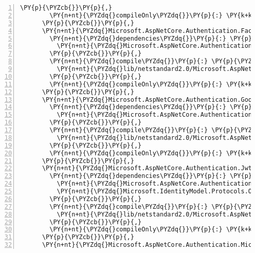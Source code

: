\begin{Verbatim}[commandchars=\\\{\},numbers=left,firstnumber=1,stepnumber=1,numberblanklines=0]
        \PY{p}{\PYZcb{}}\PY{p}{,}
        \PY{n+nt}{\PYZdq{}compileOnly\PYZdq{}}\PY{p}{:} \PY{k+kc}{true}
      \PY{p}{\PYZcb{}}\PY{p}{,}
      \PY{n+nt}{\PYZdq{}Microsoft.AspNetCore.Authentication.Facebook/2.1.0\PYZhy{}rc1\PYZhy{}final\PYZdq{}}\PY{p}{:} \PY{p}{\PYZob{}}
        \PY{n+nt}{\PYZdq{}dependencies\PYZdq{}}\PY{p}{:} \PY{p}{\PYZob{}}
          \PY{n+nt}{\PYZdq{}Microsoft.AspNetCore.Authentication.OAuth\PYZdq{}}\PY{p}{:} \PY{l+s+s2}{\PYZdq{}2.1.0\PYZhy{}rc1\PYZhy{}final\PYZdq{}}
        \PY{p}{\PYZcb{}}\PY{p}{,}
        \PY{n+nt}{\PYZdq{}compile\PYZdq{}}\PY{p}{:} \PY{p}{\PYZob{}}
          \PY{n+nt}{\PYZdq{}lib/netstandard2.0/Microsoft.AspNetCore.Authentication.Facebook.dll\PYZdq{}}\PY{p}{:} \PY{p}{\PYZob{}}\PY{p}{\PYZcb{}}
        \PY{p}{\PYZcb{}}\PY{p}{,}
        \PY{n+nt}{\PYZdq{}compileOnly\PYZdq{}}\PY{p}{:} \PY{k+kc}{true}
      \PY{p}{\PYZcb{}}\PY{p}{,}
      \PY{n+nt}{\PYZdq{}Microsoft.AspNetCore.Authentication.Google/2.1.0\PYZhy{}rc1\PYZhy{}final\PYZdq{}}\PY{p}{:} \PY{p}{\PYZob{}}
        \PY{n+nt}{\PYZdq{}dependencies\PYZdq{}}\PY{p}{:} \PY{p}{\PYZob{}}
          \PY{n+nt}{\PYZdq{}Microsoft.AspNetCore.Authentication.OAuth\PYZdq{}}\PY{p}{:} \PY{l+s+s2}{\PYZdq{}2.1.0\PYZhy{}rc1\PYZhy{}final\PYZdq{}}
        \PY{p}{\PYZcb{}}\PY{p}{,}
        \PY{n+nt}{\PYZdq{}compile\PYZdq{}}\PY{p}{:} \PY{p}{\PYZob{}}
          \PY{n+nt}{\PYZdq{}lib/netstandard2.0/Microsoft.AspNetCore.Authentication.Google.dll\PYZdq{}}\PY{p}{:} \PY{p}{\PYZob{}}\PY{p}{\PYZcb{}}
        \PY{p}{\PYZcb{}}\PY{p}{,}
        \PY{n+nt}{\PYZdq{}compileOnly\PYZdq{}}\PY{p}{:} \PY{k+kc}{true}
      \PY{p}{\PYZcb{}}\PY{p}{,}
      \PY{n+nt}{\PYZdq{}Microsoft.AspNetCore.Authentication.JwtBearer/2.1.0\PYZhy{}rc1\PYZhy{}final\PYZdq{}}\PY{p}{:} \PY{p}{\PYZob{}}
        \PY{n+nt}{\PYZdq{}dependencies\PYZdq{}}\PY{p}{:} \PY{p}{\PYZob{}}
          \PY{n+nt}{\PYZdq{}Microsoft.AspNetCore.Authentication\PYZdq{}}\PY{p}{:} \PY{l+s+s2}{\PYZdq{}2.1.0\PYZhy{}rc1\PYZhy{}final\PYZdq{}}\PY{p}{,}
          \PY{n+nt}{\PYZdq{}Microsoft.IdentityModel.Protocols.OpenIdConnect\PYZdq{}}\PY{p}{:} \PY{l+s+s2}{\PYZdq{}5.2.0\PYZdq{}}
        \PY{p}{\PYZcb{}}\PY{p}{,}
        \PY{n+nt}{\PYZdq{}compile\PYZdq{}}\PY{p}{:} \PY{p}{\PYZob{}}
          \PY{n+nt}{\PYZdq{}lib/netstandard2.0/Microsoft.AspNetCore.Authentication.JwtBearer.dll\PYZdq{}}\PY{p}{:} \PY{p}{\PYZob{}}\PY{p}{\PYZcb{}}
        \PY{p}{\PYZcb{}}\PY{p}{,}
        \PY{n+nt}{\PYZdq{}compileOnly\PYZdq{}}\PY{p}{:} \PY{k+kc}{true}
      \PY{p}{\PYZcb{}}\PY{p}{,}
      \PY{n+nt}{\PYZdq{}Microsoft.AspNetCore.Authentication.MicrosoftAccount/2.1.0\PYZhy{}rc1\PYZhy{}final\PYZdq{}}\PY{p}{:} \PY{p}{\PYZob{}}

\end{Verbatim}
